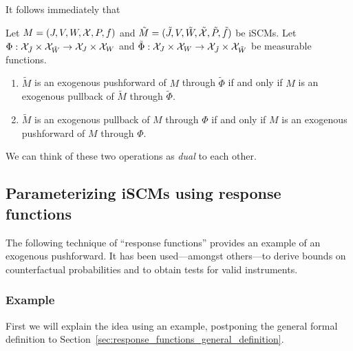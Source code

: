 It follows immediately that
\begin{Prp}
Let $M = \left ( J, V, W, \mathcal{X}, P, f \right )$ and $\tilde{M} = ( \tilde{J}, V, \tilde{W}, \tilde{\mathcal{X}}, \tilde{P}, \tilde{f} )$ be iSCMs.
Let $\Phi : \mathcal{X}_{\tilde J} \times \mathcal{X}_{\tilde W} \to \mathcal{X}_{J} \times \mathcal{X}_{W}$ and $\tilde{\Phi} : \mathcal{X}_J \times \mathcal{X}_W \to \mathcal{X}_{\tilde{J}} \times \mathcal{X}_{\tilde{W}}$ be measurable functions.
  \begin{enumerate}
    \item $\tilde{M}$ is an exogenous pushforward of $M$ through $\tilde\Phi$ if and only if $M$ is an exogenous pullback of $\tilde{M}$ through $\tilde\Phi$.
    \item $\tilde{M}$ is an exogenous pullback of $M$ through $\Phi$ if and only if $M$ is an exogenous pushforward of $M$ through $\Phi$.
  \end{enumerate}
\end{Prp}
We can think of these two operations as \emph{dual} to each other.

\subsection{Parameterizing iSCMs using response functions}\label{sec:response_functions}

The following technique of ``response functions'' \cite{BalkePearl1994b} provides an example of an exogenous pushforward.
It has been used---amongst others---to derive bounds on counterfactual probabilities and to obtain tests for valid instruments.

\subsubsection{Example}

First we will explain the idea using an example, postponing the general formal definition to Section~\ref{sec:response_functions_general_definition}.

